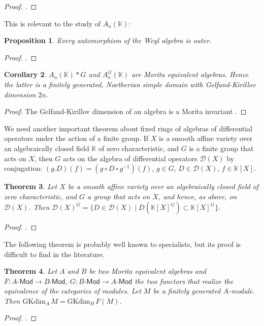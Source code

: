 \documentclass[12pt, a4paper]{amsart}
\newtheorem{theorem}{Theorem}[section]
\newtheorem{corollary}[theorem]{Corollary}
\newtheorem{proposition}[theorem]{Proposition}
\newcommand{\Weyl}{A_n(\mathbb{K})} %
\newcommand{\Invar}{A_n^G(\mathbb{K})}           %
\newcommand{\GKdim}{\text{GKdim}}    %
\def\D{\mathcal D}
\def\KK{\mathbb K}
\newcommand{\Mod}{\mathsf{Mod}}
\begin{document}
\begin{proof}
    \cite[Theorem 2.4, Theorem 2.5, Corollary 2.6]{Montgomery}.
\end{proof}
This is relevant to the study of $\Weyl$:
\begin{proposition}\label{Weyl-outer}
    Every automorphism of the Weyl algebra is outer.
\end{proposition}
\begin{proof}
    \cite[2.4.1]{Dumas}.
\end{proof}
\begin{corollary}\label{Morita-invariants-Weyl}
   $\Weyl *G$ and $\Invar$ are Morita equivalent algebras. Hence the latter is a finitely generated, Noetherian simple domain with Gelfand-Kirillov dimension $2n$.
\end{corollary}
\begin{proof}
    The Gelfand-Kirillov dimension of an algebra is a Morita invariant \cite[Proposition 8.2.9(iii)]{McConnell}.
\end{proof}
We need another important theorem about fixed rings of algebras of differential operators under the action of a finite group. If $X$ is a smooth affine variety over an algebraically closed field $\KK$ of zero characteristic, and $G$ is a finite group that acts on $X$, then $G$ acts on the algebra of differential operators $\D(X)$ by conjugation: $(g.D)(f)=(g \circ D \circ g^{-1})(f)$, $g \in G$, $D \in \D(X)$, $f \in \KK[X]$.
\begin{theorem}\label{Knop}
    Let $X$ be a smooth affine variety over an algebraically closed field of zero characteristic, and $G$ a group that acts on $X$, and hence, as above, on $\D(X)$. Then $\D(X)^G=\{D \in \D(X) \mid D(\KK[X]^G) \subset \KK[X]^G \}.$
\end{theorem}
\begin{proof}
    \cite[Theorem 3.1]{Knop}.
\end{proof}
The following theorem is probably well known to specialists, but its proof is difficult to find in the literature.
\begin{theorem}\label{GK-is-Morita-for-modules}
    Let $A$ and $B$ be two Morita equivalent algebras and $F: A\text{-}\Mod \rightarrow B\text{-}\Mod$, $G: B\text{-}\Mod \rightarrow A\text{-}\Mod$ the two functors that realize the equivalence of the categories of modules. Let $M$ be a finitely generated $A$-module. Then $\GKdim_A \, M = \GKdim_B \, F(M)$.
\end{theorem}
\begin{proof}
    \cite[Theorem 1.7]{BH}.
\end{proof}
\end{document}
